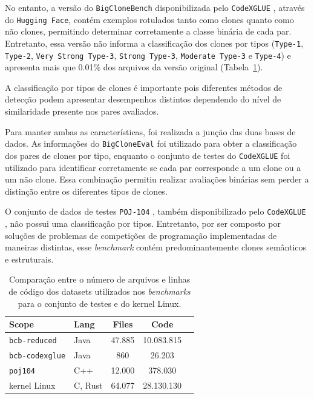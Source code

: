 \documentclass[twocolumn]{article}
\def\kernelfile{64.077}
\def\kernelloc{28.130.130}
\begin{document}
No entanto, a versão do \texttt{BigCloneBench} disponibilizada pelo \texttt{CodeXGLUE} \cite{codexglue}, através do \texttt{Hugging Face}, contém exemplos rotulados tanto como clones quanto como não clones, permitindo determinar corretamente a classe binária de cada par. Entretanto, essa versão não informa a classificação dos clones por tipos (\texttt{Type-1}, \texttt{Type-2}, \texttt{Very Strong Type-3}, \texttt{Strong Type-3}, \texttt{Moderate Type-3} e \texttt{Type-4}) e apresenta mais que 0.01\% dos arquivos da versão original (Tabela~\ref{tab:locs}).

A classificação por tipos de clones é importante pois diferentes métodos de detecção podem apresentar desempenhos distintos dependendo do nível de similaridade presente nos pares avaliados.

Para manter ambas as características, foi realizada a junção das duas bases de dados. As informações do \texttt{BigCloneEval} foi utilizado para obter a classificação dos pares de clones por tipo, enquanto o conjunto de testes do \texttt{CodeXGLUE} foi utilizado para identificar corretamente se cada par corresponde a um clone ou a um não clone. Essa combinação permitiu realizar avaliações binárias sem perder a distinção entre os diferentes tipos de clones.

O conjunto de dados de testes \texttt{POJ-104} \cite{mou2016convolutional}, também disponibilizado pelo \texttt{CodeXGLUE} \cite{codexglue}, não possui uma classificação por tipos. Entretanto, por ser composto por soluções de problemas de competições de programação implementadas de maneiras distintas, esse \textit{benchmark} contém predominantemente clones semânticos e estruturais.

\begin{table}[ht!]
\centering
\begin{tabular}{l l c c c}
\toprule
\textbf{Scope} & \textbf{Lang} & \textbf{Files} & \textbf{Code} \\
\midrule
\texttt{bcb-reduced} & Java & 47.885 & 10.083.815 \\
\texttt{bcb-codexglue} & Java & 860 & 26.203 \\
\texttt{poj104}\footnotemark & C++ & 12.000 & 378.030 \\
kernel Linux & C, Rust & \kernelfile & \kernelloc \\
\bottomrule
\end{tabular}
\caption{Comparação entre o número de arquivos e linhas de código dos datasets utilizados nos \textit{benchmarks} para o conjunto de testes e do kernel Linux.}
\label{tab:locs}
\end{table}
\end{document}
